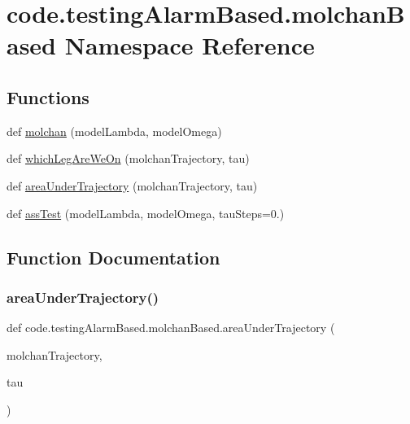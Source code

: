 \hypertarget{namespacecode_1_1testing_alarm_based_1_1molchan_based}{}\section{code.\+testing\+Alarm\+Based.\+molchan\+Based Namespace Reference}
\label{namespacecode_1_1testing_alarm_based_1_1molchan_based}
\subsection*{Functions}
\begin{DoxyCompactItemize}
\item 
def \hyperlink{namespacecode_1_1testing_alarm_based_1_1molchan_based_a58209ab6fe99f49980840a862f96ee5a}{molchan} (model\+Lambda, model\+Omega)
\item 
def \hyperlink{namespacecode_1_1testing_alarm_based_1_1molchan_based_acdd42a8c19feb0de5a9f993908a8f2d6}{which\+Leg\+Are\+We\+On} (molchan\+Trajectory, tau)
\item 
def \hyperlink{namespacecode_1_1testing_alarm_based_1_1molchan_based_aff91d35a8e1f80f4f7b540f7b3fd6295}{area\+Under\+Trajectory} (molchan\+Trajectory, tau)
\item 
def \hyperlink{namespacecode_1_1testing_alarm_based_1_1molchan_based_a1963447bb2c467f0bbeb68c24474f548}{ass\+Test} (model\+Lambda, model\+Omega, tau\+Steps=0.)
\end{DoxyCompactItemize}


\subsection{Function Documentation}
\mbox{\label{namespacecode_1_1testing_alarm_based_1_1molchan_based_aff91d35a8e1f80f4f7b540f7b3fd6295}} 
\subsubsection{\texorpdfstring{area\+Under\+Trajectory()}{areaUnderTrajectory()}}
{\footnotesize\ttfamily def code.\+testing\+Alarm\+Based.\+molchan\+Based.\+area\+Under\+Trajectory (\begin{DoxyParamCaption}\item[{}]{molchan\+Trajectory,  }\item[{}]{tau }\end{DoxyParamCaption})}

